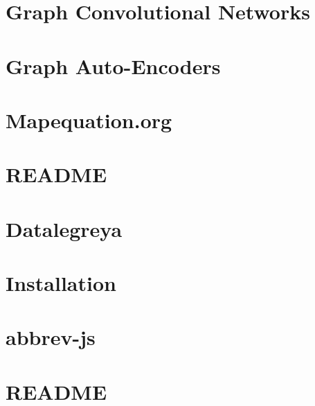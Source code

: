 \documentclass[twoside]{book}
\newcommand{\+}{\discretionary{\mbox{\scriptsize$\hookleftarrow$}}{}{}}
\begin{document}
\chapter{Graph Convolutional Networks}
\label{md_dsmacc_examples_gcn_README}

\chapter{Graph Auto-\/\+Encoders}
\label{md_dsmacc_examples_graph_auto_encoder_README}

\chapter{Mapequation.\+org}
\label{md_dsmacc_graph_infomap_README}

\chapter{R\+E\+A\+D\+ME}
\label{md_dsmacc_README}

\chapter{Datalegreya}
\label{md_dsmacc_vis_datalegreya-master_README}

\chapter{Installation}
\label{md_dsmacc_vis_degree_node_modules__0Dtypes_node_README}

\chapter{abbrev-\/js}
\label{md_dsmacc_vis_degree_node_modules_abbrev_README}

\chapter{R\+E\+A\+D\+ME}
\label{md_dsmacc_vis_degree_node_modules_ajv_lib_dotjs_README}

\end{document}
